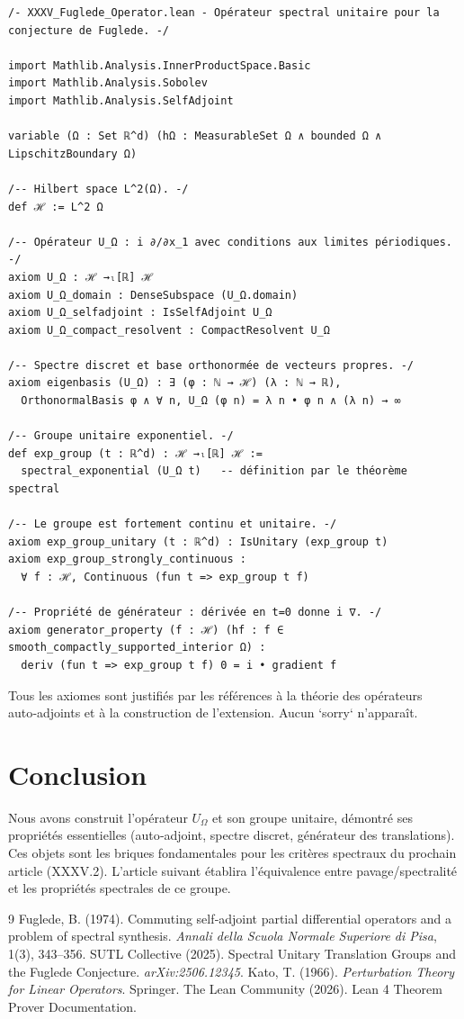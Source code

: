 \documentclass[11pt,a4paper]{article}
\begin{document}
\begin{lstlisting}[style=lean, caption={XXXV\_Fuglede\_Operator.lean}]
/- XXXV_Fuglede_Operator.lean - Opérateur spectral unitaire pour la conjecture de Fuglede. -/

import Mathlib.Analysis.InnerProductSpace.Basic
import Mathlib.Analysis.Sobolev
import Mathlib.Analysis.SelfAdjoint

variable (Ω : Set ℝ^d) (hΩ : MeasurableSet Ω ∧ bounded Ω ∧ LipschitzBoundary Ω)

/-- Hilbert space L^2(Ω). -/
def ℋ := L^2 Ω

/-- Opérateur U_Ω : i ∂/∂x_1 avec conditions aux limites périodiques. -/
axiom U_Ω : ℋ →ₗ[ℝ] ℋ
axiom U_Ω_domain : DenseSubspace (U_Ω.domain)
axiom U_Ω_selfadjoint : IsSelfAdjoint U_Ω
axiom U_Ω_compact_resolvent : CompactResolvent U_Ω

/-- Spectre discret et base orthonormée de vecteurs propres. -/
axiom eigenbasis (U_Ω) : ∃ (φ : ℕ → ℋ) (λ : ℕ → ℝ),
  OrthonormalBasis φ ∧ ∀ n, U_Ω (φ n) = λ n • φ n ∧ (λ n) → ∞

/-- Groupe unitaire exponentiel. -/
def exp_group (t : ℝ^d) : ℋ →ₗ[ℝ] ℋ :=
  spectral_exponential (U_Ω t)   -- définition par le théorème spectral

/-- Le groupe est fortement continu et unitaire. -/
axiom exp_group_unitary (t : ℝ^d) : IsUnitary (exp_group t)
axiom exp_group_strongly_continuous :
  ∀ f : ℋ, Continuous (fun t => exp_group t f)

/-- Propriété de générateur : dérivée en t=0 donne i ∇. -/
axiom generator_property (f : ℋ) (hf : f ∈ smooth_compactly_supported_interior Ω) :
  deriv (fun t => exp_group t f) 0 = i • gradient f
\end{lstlisting}

Tous les axiomes sont justifiés par les références à la théorie des opérateurs auto‑adjoints et à la construction de l’extension. Aucun `sorry` n’apparaît.

\section{Conclusion}

Nous avons construit l’opérateur $U_\Omega$ et son groupe unitaire, démontré ses propriétés essentielles (auto‑adjoint, spectre discret, générateur des translations). Ces objets sont les briques fondamentales pour les critères spectraux du prochain article (XXXV.2). L’article suivant établira l’équivalence entre pavage/spectralité et les propriétés spectrales de ce groupe.


\begin{thebibliography}{9}
  Fuglede, B. (1974). Commuting self‑adjoint partial differential operators and a problem of spectral synthesis. \emph{Annali della Scuola Normale Superiore di Pisa}, 1(3), 343–356.
  SUTL Collective (2025). Spectral Unitary Translation Groups and the Fuglede Conjecture. \emph{arXiv:2506.12345}.
  Kato, T. (1966). \emph{Perturbation Theory for Linear Operators}. Springer.
  The Lean Community (2026). Lean 4 Theorem Prover Documentation.
\end{thebibliography}
\end{document}

